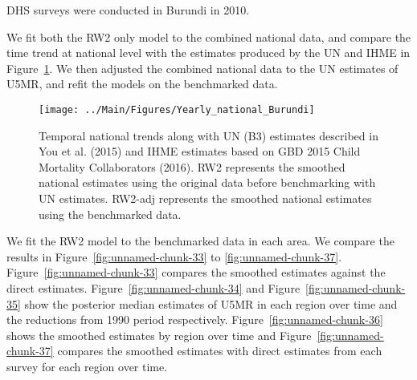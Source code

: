 \documentclass[12pt]{article}\usepackage[]{graphicx}\usepackage[]{color}
\newenvironment{knitrout}{}{} %
\begin{document}


DHS surveys were conducted in Burundi in 2010.

We fit both the RW2 only model to the combined national data, and compare the time trend at national level with the estimates produced by the UN and IHME in Figure~\ref{fig:unnamed-chunk-32}. We then adjusted the combined national data to the UN estimates of U5MR, and refit the models on the benchmarked data. 

\begin{knitrout}
\color{fgcolor}\begin{figure}[bht]

{\centering \texttt{[image: ../Main/Figures/Yearly\_national\_Burundi]} 

}

\caption[Temporal national trends along with UN (B3) estimates described in You et al]{Temporal national trends along with UN (B3) estimates described in You et al. (2015) and IHME estimates based on GBD 2015 Child Mortality Collaborators (2016). RW2 represents the smoothed national estimates using the original data before benchmarking with UN estimates. RW2-adj represents the smoothed national estimates using the benchmarked data.}\label{fig:unnamed-chunk-32}
\end{figure}


\end{knitrout}
 

We fit the RW2 model to the benchmarked data in each area. 
We compare the results in Figure~\ref{fig:unnamed-chunk-33} to \ref{fig:unnamed-chunk-37}.
Figure~\ref{fig:unnamed-chunk-33} compares the smoothed estimates against the direct estimates. Figure~\ref{fig:unnamed-chunk-34} and Figure~\ref{fig:unnamed-chunk-35} show the posterior median estimates of U5MR in each region over time and the reductions from 1990 period respectively.
Figure~\ref{fig:unnamed-chunk-36} shows the smoothed estimates by region over time and Figure~\ref{fig:unnamed-chunk-37} compares the smoothed estimates with direct estimates from each survey for each region over time.


\end{document}
